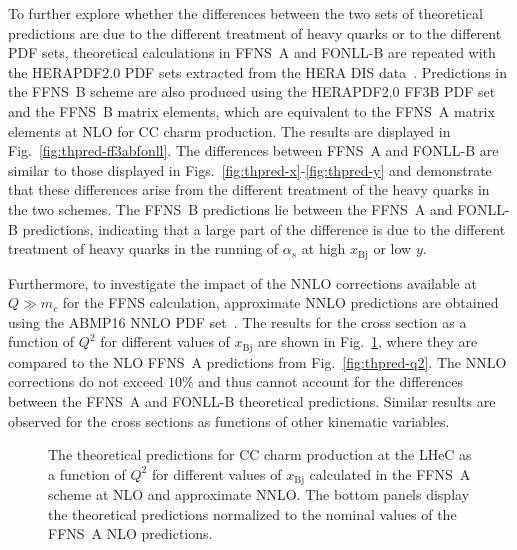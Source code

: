 \documentclass[pdftex,twocolumn,epjc3]{svjour3}          %
\newcommand{\abmp} {ABMP16\xspace}
\newcommand{\xbj}{\ensuremath{x_{\text{Bj}}}\xspace}
\newcommand{\fonll} {{FONLL-B}\xspace}
\newcommand{\ffns} {{FFNS~A}\xspace}
\newcommand{\ffnsb} {{FFNS~B}\xspace}
\newcommand{\ffthreeb} {{\hbox{HERAPDF2.0} FF3B}\xspace}
\begin{document}
To further explore whether the differences between the two sets of
theoretical predictions are due to the different treatment of heavy
quarks or to the different PDF sets, theoretical calculations in \ffns
and \fonll are repeated with the HERAPDF2.0 PDF sets extracted from
the HERA DIS data~\cite{Abramowicz:2015mha}.
%
Predictions in the \ffnsb scheme are also produced using the \ffthreeb
PDF set and the \ffnsb matrix elements, which are equivalent to the
\ffns matrix elements at NLO for CC charm production. The results are
displayed in Fig.~\ref{fig:thpred-ff3abfonll}. The differences between
\ffns and \fonll are similar to those displayed in
Figs.~\ref{fig:thpred-x}-\ref{fig:thpred-y} and demonstrate that these
differences arise from the different treatment of the heavy quarks in
the two schemes. The \ffnsb predictions lie between the \ffns and
\fonll predictions, indicating that a large part of the difference
is due to the different treatment of heavy quarks in the running of
$\alpha_s$ at high \xbj or low $y$.


Furthermore, to investigate the impact of the NNLO corrections
available at $Q \gg m_c$ for the FFNS calculation, approximate NNLO
predictions are obtained using the \abmp NNLO PDF
set~\cite{Alekhin:2017kpj}. The results for the cross section as a
function of $Q^2$ for different values of \xbj are shown in
Fig.~\ref{fig:thpred-q2-nnlo}, where they are compared to the NLO
\ffns predictions from Fig.~\ref{fig:thpred-q2}. The NNLO corrections
do not exceed $10\%$ and thus cannot account for the differences
between the \ffns and \fonll theoretical predictions. Similar results
are observed for the cross sections as functions of other kinematic
variables.


%
%
%
%
%
%
%
%
%
%
%
%
%
%
%
%
%
%
%
%
%
%
%
%

\begin{figure}
  \centering
  \caption{The theoretical predictions
    for CC charm production at the LHeC as a function of $Q^2$ for
    different values of \xbj calculated in the \ffns scheme at NLO and
    approximate NNLO. The bottom panels display the theoretical
    predictions normalized to the nominal values of the \ffns NLO
    predictions.}
  \label{fig:thpred-q2-nnlo}
\end{figure}
\end{document}
